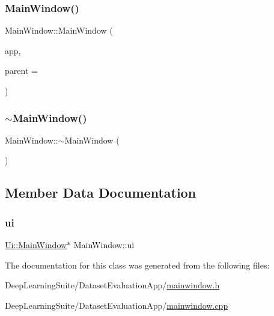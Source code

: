 \subsubsection{\texorpdfstring{Main\+Window()}{MainWindow()}}
{\footnotesize\ttfamily Main\+Window\+::\+Main\+Window (\begin{DoxyParamCaption}\item[{\hyperlink{class_sample_generation_app}{Sample\+Generation\+App} $\ast$}]{app,  }\item[{Q\+Widget $\ast$}]{parent = {} }\end{DoxyParamCaption})\hspace{0.3cm}{\ttfamily [explicit]}}

\mbox{\label{class_main_window_ae98d00a93bc118200eeef9f9bba1dba7}} 
\subsubsection{\texorpdfstring{$\sim$\+Main\+Window()}{~MainWindow()}}
{\footnotesize\ttfamily Main\+Window\+::$\sim$\+Main\+Window (\begin{DoxyParamCaption}{ }\end{DoxyParamCaption})}



\subsection{Member Data Documentation}
\mbox{\label{class_main_window_a35466a70ed47252a0191168126a352a5}} 
\subsubsection{\texorpdfstring{ui}{ui}}
{\footnotesize\ttfamily \hyperlink{class_ui_1_1_main_window}{Ui\+::\+Main\+Window}$\ast$ Main\+Window\+::ui}



The documentation for this class was generated from the following files\+:\begin{DoxyCompactItemize}
\item 
Deep\+Learning\+Suite/\+Dataset\+Evaluation\+App/\hyperlink{mainwindow_8h}{mainwindow.\+h}\item 
Deep\+Learning\+Suite/\+Dataset\+Evaluation\+App/\hyperlink{mainwindow_8cpp}{mainwindow.\+cpp}\end{DoxyCompactItemize}
